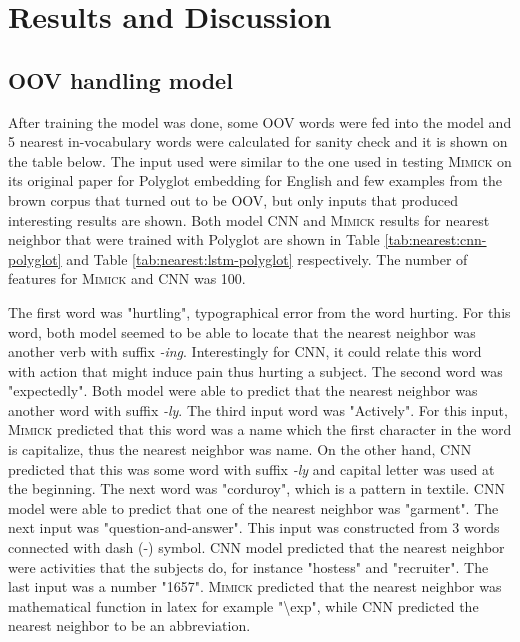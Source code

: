 \chapter{Results and Discussion}
\label{chap:results}
    \section{OOV handling model}
        After training the model was done, some OOV words were fed
        into the model and 5 nearest in-vocabulary words were
        calculated for sanity check and it is shown on the table
        below. The input used were similar to the one used in testing
        \textsc{Mimick} on its original paper for Polyglot embedding
        for English and few examples from the brown corpus that turned
        out to be OOV, but only inputs that produced interesting
        results are shown. Both model CNN and \textsc{Mimick} results
        for nearest neighbor that were trained with Polyglot are shown
        in Table \ref{tab:nearest:cnn-polyglot} and Table
        \ref{tab:nearest:lstm-polyglot} respectively. The number of
        features for \textsc{Mimick} and CNN was 100.

        The first word was "hurtling", typographical error from the
        word hurting. For this word, both model seemed to be able to
        locate that the nearest neighbor was another verb with suffix
        \textit{-ing}. Interestingly for CNN, it could relate this
        word with action that might induce pain thus hurting a
        subject. The second word was "expectedly". Both model were
        able to predict that the nearest neighbor was another word
        with suffix \textit{-ly}. The third input word was "Actively".
        For this input, \textsc{Mimick} predicted that this word was a
        name which the first character in the word is capitalize, thus
        the nearest neighbor was name. On the other hand, CNN
        predicted that this was some word with suffix \textit{-ly} and
        capital letter was used at the beginning. The next word was
        "corduroy", which is a pattern in textile. CNN model were able
        to predict that one of the nearest neighbor was "garment". The
        next input was "question-and-answer". This input was constructed
        from 3 words connected with dash (-) symbol. CNN model
        predicted that the nearest neighbor were activities that the
        subjects do, for instance "hostess" and "recruiter". The last
        input was a number "1657". \textsc{Mimick} predicted that the
        nearest neighbor was mathematical function in latex for example
        "\textbackslash exp", while CNN predicted the nearest neighbor
        to be an abbreviation.

